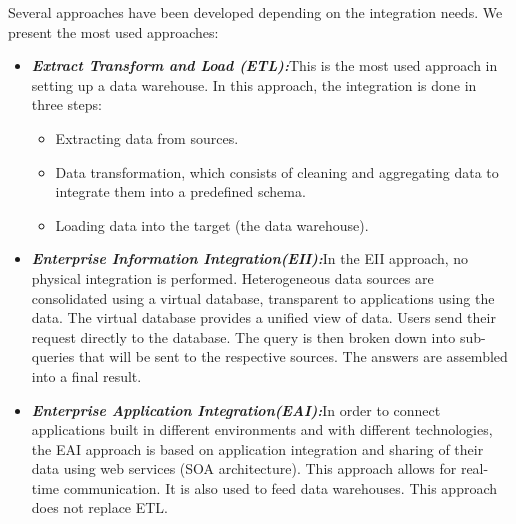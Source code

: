 Several approaches have been developed depending on the integration needs. We present the most used approaches\cite{naitEntropot}:
\begin{itemize}
  \item \textbf{\textit{Extract Transform and Load (ETL):}}\newline This is the most used approach in setting up a data warehouse. In this approach, the integration is done in three steps:
\begin{itemize}
\item Extracting data from sources.
\item Data transformation, which consists of cleaning and aggregating data to integrate them into a predefined schema.
\item Loading data into the target (the data warehouse).
\end{itemize}

  \item \textbf{\textit{Enterprise Information Integration(EII):}}\newline In the EII approach, no physical integration is performed. Heterogeneous data sources are consolidated using a virtual database, transparent to applications using the data. The virtual database provides a unified view of data. Users send their request directly to the database. The query is then broken down into sub-queries that will be sent to the respective sources. The answers are assembled into a final result.
  \item \textbf{\textit{Enterprise Application Integration(EAI):}}\newline In order to connect applications built in different environments and with different technologies, the EAI approach is based on application integration and sharing of their data using web services (SOA architecture). This approach allows for real-time communication.
It is also used to feed data warehouses. This approach does not replace ETL.
\end{itemize}


